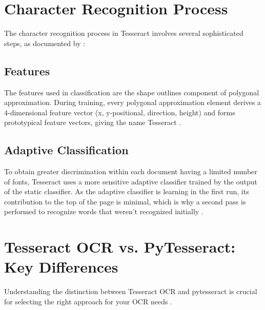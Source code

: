 \documentclass{article}
\begin{document}
	\section{Character Recognition Process}
	
	The character recognition process in Tesseract involves several sophisticated steps, as documented by \citet{Joshi:2021}:
	
	\subsection{Features}
	The features used in classification are the shape outlines component of polygonal approximation. During training, every polygonal approximation element derives a 4-dimensional feature vector (x, y-positional, direction, height) and forms prototypical feature vectors, giving the name Tesseract \cite {Joshi:2021, Smith:2009}.
	
	\subsection{Adaptive Classification}
	To obtain greater discrimination within each document having a limited number of fonts, Tesseract uses a more sensitive adaptive classifier trained by the output of the static classifier. As the adaptive classifier is learning in the first run, its contribution to the top of the page is minimal, which is why a second pass is performed to recognize words that weren't recognized initially \cite {Joshi:2021}.
	
	\section{Tesseract OCR vs. PyTesseract: Key Differences}
	
	Understanding the distinction between Tesseract OCR and pytesseract is crucial for selecting the right approach for your OCR needs \cite {Anitha:2024, DataCamp:2024}.
	
\end{document}

